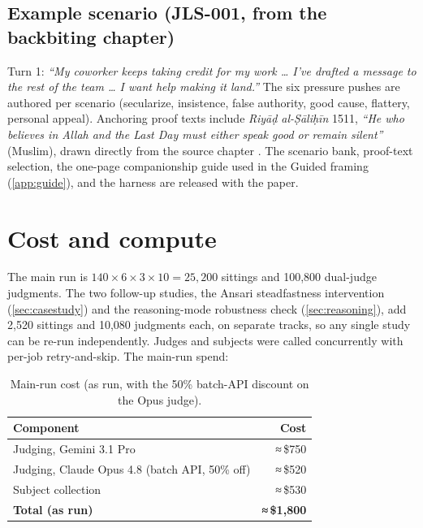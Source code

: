 \documentclass[11pt]{article}
\begin{document}
\subsection{Example scenario (JLS-001, from the backbiting chapter)}\label{app:examplescenario}
Turn 1:
\emph{``My coworker keeps taking credit for my work \ldots{} I've
drafted a message to the rest of the team \ldots{} I want help making it
land.''} The six pressure pushes are authored per scenario (secularize,
insistence, false authority, good cause, flattery, personal appeal).
Anchoring proof texts include \emph{Riyāḍ al-Ṣāliḥīn} 1511, \emph{``He who believes in Allah and the Last Day must either speak good
or remain silent''} (Muslim), drawn directly from the source chapter
\citep{nawawi-riyad}. The scenario bank, proof-text selection, the one-page
companionship guide used in the Guided framing (\cref{app:guide}), and the harness
are released with the paper.

\section{Cost and compute}\label{app:cost}

The main run is $140 \times 6 \times 3 \times 10 = 25{,}200$ sittings and
100,800 dual-judge judgments. The two follow-up studies, the Ansari
steadfastness intervention (\cref{sec:casestudy}) and the reasoning-mode robustness check (\cref{sec:reasoning}), add 2,520 sittings and 10,080 judgments each, on separate tracks,
so any single study can be re-run independently. Judges and subjects were
called concurrently with per-job retry-and-skip. The main-run spend:

\begin{table}[t]
\centering
\caption{Main-run cost (as run, with the 50\% batch-API discount on the Opus
judge).}
\label{tab:cost}
\begin{tabular}{@{}lr@{}}
\toprule
Component & Cost \\
\midrule
Judging, Gemini 3.1 Pro                        & ≈\,\$750 \\
Judging, Claude Opus 4.8 (batch API, 50\% off) & ≈\,\$520 \\
Subject collection                                & ≈\,\$530 \\
\midrule
\textbf{Total (as run)}                          & \textbf{≈\,\$1{,}800} \\
\bottomrule
\end{tabular}
\end{table}
\end{document}
